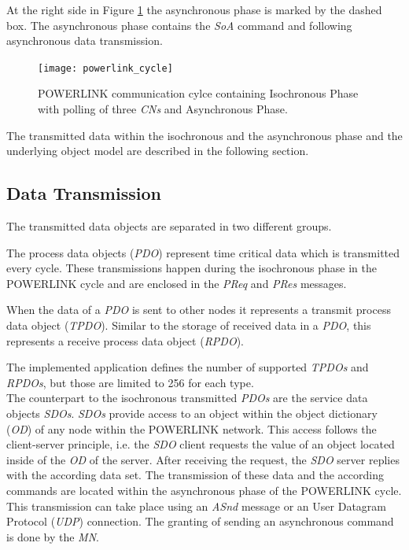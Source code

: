At the right side in Figure \ref{fig:powerlink_cycle} the asynchronous phase is marked by the dashed box.
The asynchronous phase contains the \emph{SoA} command  and following asynchronous data transmission.

\begin{figure}
    \centering
    \texttt{[image: powerlink\_cycle]}
    \caption{POWERLINK communication cylce containing Isochronous Phase with polling of three \emph{CNs} and Asynchronous Phase.}
    \label{fig:powerlink_cycle}
\end{figure}

The transmitted data within the isochronous and the asynchronous phase and the underlying object model are described in the following section.

\subsection{Data Transmission}
\label{sec:oplk_powerlink_data_transmission}
The transmitted data objects are separated in two different groups.

\begin{sloppypar}
The process data objects (\emph{PDO}) represent time critical data which is transmitted every cycle.
These transmissions happen during the isochronous phase in the POWERLINK cycle and are enclosed in the \emph{PReq} and \emph{PRes} messages.
\end{sloppypar}

When the data of a \emph{PDO} is sent to other nodes it represents a transmit process data object (\emph{TPDO}).
Similar to the storage of received data in a \emph{PDO}, this represents a receive process data object (\emph{RPDO}).

The implemented application defines the number of supported \emph{TPDOs} and \emph{RPDOs}, but those are limited to 256 for each type. \cite[section 6.4]{epsg_epsg_2013}
\\

The counterpart to the isochronous transmitted \emph{PDOs} are the service data objects \emph{SDOs}.
\emph{SDOs} provide access to an object within the object dictionary (\emph{OD}) of any node within the POWERLINK network.
This access follows the client-server principle, i.e. the \emph{SDO} client requests the value of an object located inside of the  \emph{OD} of the server.
After receiving the request, the \emph{SDO} server replies with the according data set.
The transmission of these data and the according commands are located within the asynchronous phase of the POWERLINK cycle.
This transmission can take place using an \emph{ASnd} message or an User Datagram Protocol (\emph{UDP}) connection.
The granting of sending an asynchronous command is done by the \emph{MN}.

